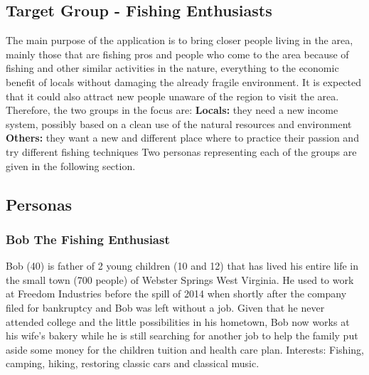 \subsection{Target Group - Fishing Enthusiasts}
\label{TargetGroup}
The main purpose of the application is to bring closer people living in the area, mainly those that are fishing pros and people who come to the area because of fishing and other similar activities in the nature, everything to the economic benefit of locals without damaging the already fragile environment. It is expected that it could also attract new people unaware of the region to visit the area. Therefore, the two groups in the focus are:  
\newline
\textbf{Locals:} they need a new income system, possibly based on a clean use of the natural resources and environment 
\newline
\textbf{Others:} they want a new and different place where to practice their passion and try different fishing techniques 
\newline 
\newline
Two personas representing each of the groups are given in the following section.

\subsection{Personas}
\subsubsection*{Bob The Fishing Enthusiast}
Bob (40) is father of 2 young children (10 and 12) that has lived his entire life in the small town (700 people) of Webster Springs West Virginia. He used to work at Freedom Industries before the spill of 2014 when shortly after the company filed for bankruptcy and Bob was left without a job. Given that he never attended college and the little possibilities in his hometown, Bob now works at his wife's bakery while he is still searching for another job to help the family put aside some money for the children tuition and health care plan.
\newline
Interests: Fishing, camping, hiking, restoring classic cars and classical music. 
\newline



